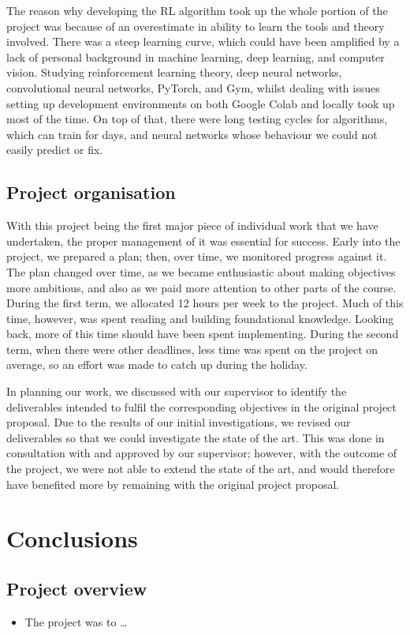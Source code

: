 \documentclass[12pt,a4paper]{article}
\begin{document}
The reason why developing the RL algorithm took up the whole portion of the project was because of an overestimate in ability to learn the tools and theory involved. There was a steep learning curve, which could have been amplified by a lack of personal background in machine learning, deep learning, and computer vision. Studying reinforcement learning theory, deep neural networks, convolutional neural networks, PyTorch, and Gym, whilst dealing with issues setting up development environments on both Google Colab and locally took up most of the time. On top of that, there were long testing cycles for algorithms, which can train for days, and neural networks whose behaviour we could not easily predict or fix.

\subsection{Project organisation}
With this project being the first major piece of individual work that we have undertaken, the proper management of it was essential for success. Early into the project, we prepared a plan; then, over time, we monitored progress against it. The plan changed over time, as we became enthusiastic about making objectives more ambitious, and also as we paid more attention to other parts of the course. During the first term, we allocated 12 hours per week to the project. Much of this time, however, was spent reading and building foundational knowledge. Looking back, more of this time should have been spent implementing. During the second term, when there were other deadlines, less time was spent on the project on average, so an effort was made to catch up during the holiday. 

In planning our work, we discussed with our supervisor to identify the deliverables intended to fulfil the corresponding objectives in the original project proposal. Due to the results of our initial investigations, we revised our deliverables so that we could investigate the state of the art. This was done in consultation with and approved by our supervisor; however, with the outcome of the project, we were not able to extend the state of the art, and would therefore have benefited more by remaining with the original project proposal. 

\newpage
\section{Conclusions}
\subsection{Project overview}
\begin{itemize}
    \item The project was to \dots
\end{itemize}
\end{document}
